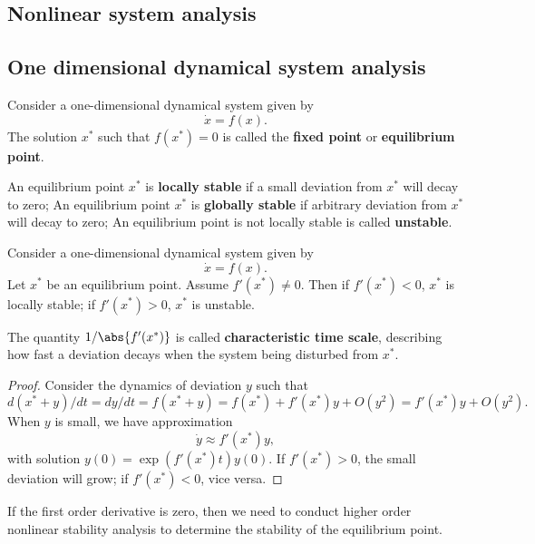 \begin{refsection}
\section{Nonlinear system analysis}


\subsection{One dimensional dynamical system analysis}


\begin{definition}\cite[18]{strogatz2014nonlinear}
Consider a one-dimensional dynamical system given by
$$\dot{x} = f(x).$$
The solution $x^*$ such that $f(x^*) = 0$ is called the \textbf{fixed point} or \textbf{equilibrium point}.

An equilibrium point $x^*$ is \textbf{locally stable} if a small deviation from $x^*$ will decay to zero;  An equilibrium point $x^*$ is \textbf{globally stable} if arbitrary deviation from $x^*$ will decay to zero; An equilibrium point is not locally stable is called \textbf{unstable}.
\end{definition}


\begin{lemma}\cite[18]{strogatz2014nonlinear}\label{ch:dynamical-systems:th:linearStabilityAnalysisNonlinearOneDimensional}
	Consider a one-dimensional dynamical system given by
	$$\dot{x} = f(x).$$
Let $x^*$ be an equilibrium point. Assume $f'(x^*) \neq 0$. 
Then if $f'(x^*) < 0$, $x^*$ is locally stable; if $f'(x^*) > 0$, $x^*$ is unstable.

The quantity $1/\abs{f'(x^*)}$ is called \textbf{characteristic time scale}, describing how fast a deviation decays when the system being disturbed from $x^*$.
\end{lemma}
\begin{proof}
Consider the dynamics of deviation $y$ such that
$$d(x^* + y)/dt = dy / dt= f(x^* + y) = f(x^*) + f'(x^*)y + O(y^2) = f'(x^*)y + O(y^2).$$
When $y$ is small, we have approximation 
$$\dot{y} \approx f'(x^*)y,$$
with solution $y(0) = \exp(f'(x^*)t)y(0)$.
If $f'(x^*) > 0$, the small deviation will grow; if $f'(x^*) < 0$, vice versa.
\end{proof}

\begin{remark}
If the first order derivative is zero, then we need to conduct higher order nonlinear stability analysis to determine the stability of the equilibrium point. 
\end{remark}



\end{refsection}
